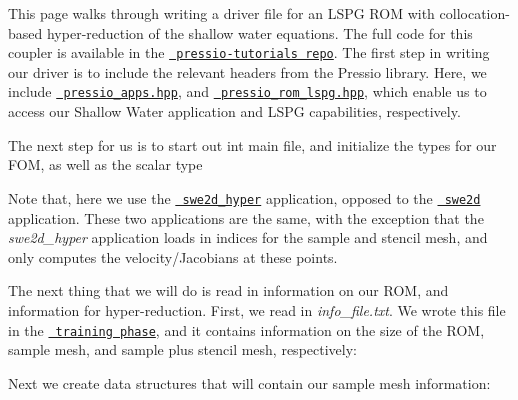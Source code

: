 This page walks through writing a driver file for an L\+S\+PG R\+OM with collocation-\/based hyper-\/reduction of the shallow water equations. The full code for this coupler is available in the \href{https://github.com/Pressio/pressio-tutorials/blob/swe2d_tutorial/tutorials/swe2d/online_phase/lspg_hyperReducedRom/run_lspg_with_hyperreduction.cc}{\texttt{ pressio-\/tutorials repo}}. The first step in writing our driver is to include the relevant headers from the Pressio library. Here, we include \href{https://github.com/Pressio/pressio/blob/master/packages/pressio_apps.hpp}{\texttt{ pressio\+\_\+apps.\+hpp}}, and \href{https://github.com/Pressio/pressio/blob/master/packages/pressio_lspg.hpp}{\texttt{ pressio\+\_\+rom\+\_\+lspg.\+hpp}}, which enable us to access our Shallow Water application and L\+S\+PG capabilities, respectively.


\begin{DoxyCode}{0}
\end{DoxyCode}


The next step for us is to start out int main file, and initialize the types for our F\+OM, as well as the scalar type 
\begin{DoxyCode}{0}
\end{DoxyCode}


Note that, here we use the \href{.}{\texttt{ swe2d\+\_\+hyper}} application, opposed to the \href{.}{\texttt{ swe2d}} application. These two applications are the same, with the exception that the {\itshape swe2d\+\_\+hyper} application loads in indices for the sample and stencil mesh, and only computes the velocity/\+Jacobians at these points.

The next thing that we will do is read in information on our R\+OM, and information for hyper-\/reduction. First, we read in {\itshape info\+\_\+file.\+txt}. We wrote this file in the \href{.}{\texttt{ training phase}}, and it contains information on the size of the R\+OM, sample mesh, and sample plus stencil mesh, respectively\+: 
\begin{DoxyCode}{0}
\end{DoxyCode}


Next we create data structures that will contain our sample mesh information\+: 
\begin{DoxyCode}{0}
\end{DoxyCode}


